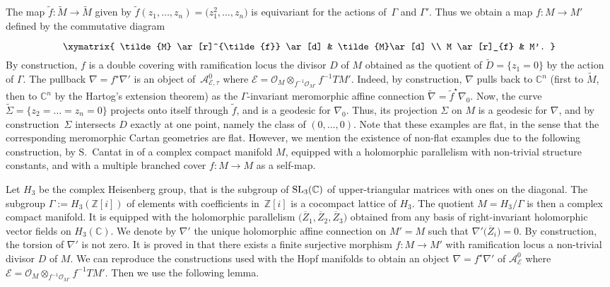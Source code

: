 \documentclass[10pt,a4paper]{amsart}
\numberwithin{equation}{section}
\begin{document}
The map $\tilde{f}\colon \tilde{M} \longrightarrow \tilde{M}$ given by $\tilde{f}(z_1,\dots,z_n) =\big(z_1^2,\dots,z_n\big)$ is equivariant for the actions of~$\Gamma$ and $\Gamma'$. Thus we obtain a map $f\colon M\longrightarrow M'$ defined by the commutative diagram\vspace{-1.5mm}
 \begin{gather*}%
\xymatrix{ \tilde{M} \ar[r]^{\tilde{f}} \ar[d] & \tilde{M}\ar[d] \\ M \ar[r]_{f} & M'. }\vspace{-1.5mm}
\end{gather*}
By construction, $f$ is a double covering with ramification locus the divisor $D$ of $M$ obtained as the quotient of $\tilde{D}=\{z_1=0\}$ by the action of $\Gamma$. The pullback $\nabla=f^\star \nabla'$ is an object of~$\mathcal{A}^0_\mathcal{E,\tau}$ where $\mathcal{E}=\mathcal{O}_M\otimes_{f^{-1}\mathcal{O}_{M'}} f^{-1}TM'$. Indeed, by construction, $\nabla$ pulls back to $\mathbb{C}^n$ (first to $\tilde{M}$, then to $\mathbb{C}^n$ by the Hartog's extension theorem) as the $\Gamma$-invariant meromorphic affine connection $\tilde{\nabla} = \tilde{f}^\star \nabla_0$. Now, the curve $\tilde{\Sigma} =\{z_2 = \dots = z_n = 0\}$ projects onto itself through $\tilde{f}$, and is a geodesic for $\nabla_0$. Thus, its projection $\Sigma$ on $M$ is a geodesic for $\nabla$, and by construction~$\Sigma$ intersects $D$ exactly at one point, namely the class of $(0,\dots,0)$. Note that these examples are flat, in the sense that the corresponding meromorphic Cartan geometries are flat.
However, we mention the existence of non-flat examples due to the following construction, by S.~Cantat in \cite[Example 5.3]{Cantat} of a complex compact manifold $M$, equipped with a holomorphic parallelism with non-trivial structure constants, and with a multiple branched cover $f\colon M \longrightarrow M$ as a self-map.

 Let $H_3$ be the complex Heisenberg group, that is the subgroup of ${\rm SL}_3(\mathbb{C})$ of upper-triangular matrices with ones on the diagonal. The subgroup $\Gamma:=H_3(\mathbb{Z}[i])$ of elements with coefficients in~$\mathbb{Z}[i]$ is a cocompact lattice of $H_3$. The quotient $M=H_3/\Gamma$ is then a complex compact manifold. It is equipped with the holomorphic parallelism $\big(\overline{Z}_1,\overline{Z}_2,\overline{Z}_3\big)$ obtained from any basis of right-invariant holomorphic vector fields on $H_3(\mathbb{C})$. We denote by $\nabla'$ the unique holomorphic affine connection on $M'=M$ such that $\nabla'\big(\overline{Z}_i\big)=0$. By construction, the torsion of $\nabla'$ is not zero. It is proved in \cite[Example 5.3]{Cantat} that there exists a finite surjective morphism $f\colon M \longrightarrow M'$ with ramification locus a non-trivial divisor $D$ of $M$. We can reproduce the constructions used with the Hopf manifolds to obtain an object $\nabla=f^\star \nabla'$ of $\mathcal{A}^0_{\mathcal{E}}$ where $\mathcal{E}= \mathcal{O}_M\otimes_{f^{-1}\mathcal{O}_{M'}} f^{-1} TM'$. Then we use the following lemma.
\end{document}
